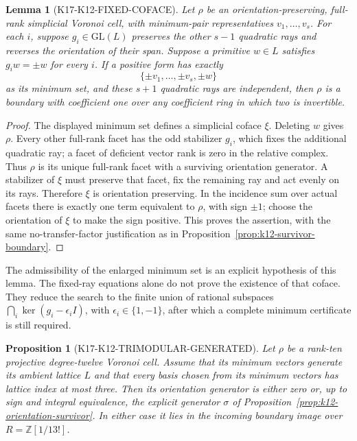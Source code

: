 \documentclass[11pt,a4paper]{article}
\newtheorem{proposition}[theorem]{Proposition}
\newtheorem{lemma}[theorem]{Lemma}
\theoremstyle{definition}
\begin{document}
\begin{lemma}[K17-K12-FIXED-COFACE]
\label{lem:k12-fixed-coface}
Let $\rho$ be an orientation-preserving, full-rank simplicial
Voronoi cell, with minimum-pair representatives $v_1,\ldots,v_s$.
For each $i$, suppose $g_i\in\mathrm{GL}(L)$ preserves the other
$s-1$ quadratic rays and reverses the orientation of their span.
Suppose a primitive $w\in L$ satisfies $g_iw=\pm w$ for every $i$.
If a positive form has exactly
\[
       \{\pm v_1,\ldots,\pm v_s,\pm w\}
\]
as its minimum set, and these $s+1$ quadratic rays are independent,
then $\rho$ is a boundary with coefficient one over any coefficient
ring in which two is invertible.
\end{lemma}

\begin{proof}
The displayed minimum set defines a simplicial coface $\xi$.
Deleting $w$ gives $\rho$. Every other full-rank facet has the
odd stabilizer $g_i$, which fixes the additional quadratic ray;
a facet of deficient vector rank is zero in the relative complex.
Thus $\rho$ is its unique full-rank facet with a surviving
orientation generator. A stabilizer of $\xi$ must preserve that
facet, fix the remaining ray and act evenly on its rays.
Therefore $\xi$ is orientation preserving. In the incidence
sum over actual facets there is exactly one term equivalent to
$\rho$, with sign $\pm1$; choose the orientation of $\xi$ to
make the sign positive. This proves the assertion, with the
same no-transfer-factor justification as in
Proposition~\ref{prop:k12-survivor-boundary}.
\end{proof}

The admissibility of the enlarged minimum set is an explicit
hypothesis of this lemma. The fixed-ray equations alone do not
prove the existence of that coface. They reduce the search to
the finite union of rational subspaces
$\bigcap_i\ker(g_i-\epsilon_i I)$, with $\epsilon_i\in\{1,-1\}$,
after which a complete minimum certificate is still required.

\begin{proposition}[K17-K12-TRIMODULAR-GENERATED]
\label{prop:k12-trimodular-generated}
Let $\rho$ be a rank-ten projective degree-twelve Voronoi cell.
Assume that its minimum vectors generate its ambient lattice $L$
and that every basis chosen from its minimum vectors has lattice
index at most three. Then its orientation generator is either
zero or, up to sign and integral equivalence, the explicit
generator $\sigma$ of
Proposition~\ref{prop:k12-orientation-survivor}.
In either case it lies in the incoming boundary image over
$R=\mathbb Z[1/13!]$.
\end{proposition}
\end{document}
